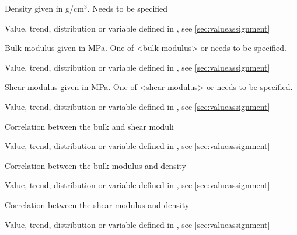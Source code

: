 {
 \slist
   \item \Description Density given in g/cm$^3$. Needs to be specified
   \item \Argument Value, trend, distribution or variable defined in , see \autoref{sec:valueassignment}
   \item \Default
 \elist

 \slist
   \item \Description Bulk modulus given in MPa. One of <bulk-modulus> or  needs to be specified.
   \item \Argument Value, trend, distribution or variable defined in , see \autoref{sec:valueassignment}
   \item \Default
 \elist

 \slist
   \item \Description Shear modulus given in MPa. One of <shear-modulus> or  needs to be specified.
   \item \Argument Value, trend, distribution or variable defined in , see \autoref{sec:valueassignment}
   \item \Default
 \elist

 \slist
   \item \Description Correlation between the bulk and shear moduli
   \item \Argument Value, trend, distribution or variable defined in , see \autoref{sec:valueassignment}
   \item {}
 \elist

 \slist
   \item \Description Correlation between the bulk modulus and density
   \item \Argument Value, trend, distribution or variable defined in , see \autoref{sec:valueassignment}
   \item {}
 \elist

 \slist
   \item \Description Correlation between the shear modulus and density
   \item \Argument Value, trend, distribution or variable defined in , see \autoref{sec:valueassignment}
   \item {}
 \elist

}
